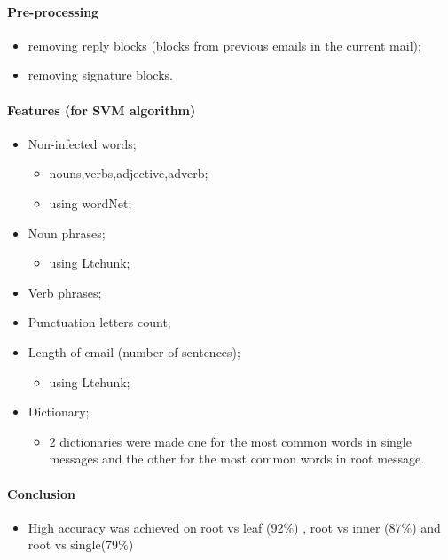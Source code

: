 \documentclass[12pt]{article}
\begin{document}
\paragraph{Pre-processing}
\begin{itemize}
    \item removing reply blocks (blocks from previous emails in the current mail);
    \item removing signature blocks.
\end{itemize}

\paragraph{Features (for SVM algorithm)}
\begin{itemize}
    \item Non-infected words;
    \begin{itemize}
        \item nouns,verbs,adjective,adverb;
        \item using wordNet;
    \end{itemize}
    \item Noun phrases;
    \begin{itemize}
        \item using Ltchunk;
    \end{itemize}
    \item Verb phrases;
    \item Punctuation letters count;
    \item Length of email (number of sentences);
    \begin{itemize}
        \item using Ltchunk;
    \end{itemize}
    \item Dictionary;
    \begin{itemize}
        \item 2 dictionaries were made one for the most common words in single messages and the other for the most common words in root message.
    \end{itemize}
\end{itemize}

\paragraph{Conclusion}
\begin{itemize}
    \item High accuracy was achieved on root vs leaf (92\%) , root vs inner (87\%) and root vs single(79\%)
\end{itemize}
\end{document}
